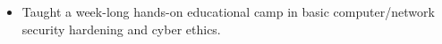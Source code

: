 {
    \begin{itemize}
        \item Taught a week-long hands-on educational camp in basic
              computer/network security hardening and cyber ethics.
    \end{itemize}
}
%
